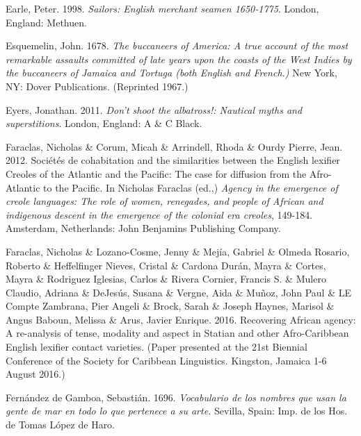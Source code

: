 \begin{styleStandard}
Earle, Peter. 1998. \textit{Sailors: English merchant seamen 1650-1775}. London, England: Methuen.
\end{styleStandard}

\begin{styleStandard}
Esquemelin, John. 1678. \textit{The buccaneers of America: A true account of the most remarkable assaults committed of late years upon the coasts of the West Indies by the buccaneers of Jamaica and Tortuga (both English and French.) }New York, NY: Dover Publications. (Reprinted 1967.)
\end{styleStandard}

\begin{styleStandard}
Eyers, Jonathan. 2011. \textit{Don’t shoot the albatross!: Nautical myths and superstitions}. London, England: A \& C Black.
\end{styleStandard}

\begin{styleStandard}
Faraclas, Nicholas \& Corum, Micah \& Arrindell, Rhoda \& Ourdy Pierre, Jean. 2012. Sociétés de cohabitation and the similarities between the English lexifier Creoles of the Atlantic and the Pacific: The case for diffusion from the Afro-Atlantic to the Pacific. In Nicholas Faraclas (ed.,) \textit{Agency in the emergence of creole languages: The role of women, renegades, and people of African and indigenous descent in the emergence of the colonial era creoles}, 149-184. Amsterdam, Netherlands: John Benjamins Publishing Company.
\end{styleStandard}

\begin{styleStandard}
Faraclas, Nicholas \& Lozano-Cosme, Jenny \& Mejía, Gabriel \& Olmeda Rosario, Roberto \& Heffelfinger Nieves, Cristal \& Cardona Durán, Mayra \& Cortes, Mayra \& Rodriguez Iglesias, Carlos \& Rivera Cornier, Francis S. \& Mulero Claudio, Adriana \& DeJesús, Susana \& Vergne, Aida \& Muñoz, John Paul \& LE Compte Zambrana, Pier Angeli \& Brock, Sarah \& Joseph Haynes, Marisol \& Angus Baboun, Melissa \& Arus, Javier Enrique. 2016. Recovering African agency: A re-analysis of tense, modality and aspect in Statian and other Afro-Caribbean English lexifier contact varieties. (Paper presented at the 21st Biennial Conference of the Society for Caribbean Linguistics. Kingston, Jamaica 1-6 August 2016.)
\end{styleStandard}

\begin{styleStandard}
Fernández de Gamboa, Sebastián. 1696. \textit{Vocabulario de los nombres que usan la gente de mar en todo lo que pertenece a su arte.} Sevilla, Spain: Imp. de los Hos. de Tomas López de Haro.
\end{styleStandard}

